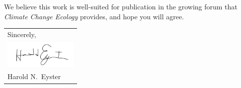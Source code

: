 \documentclass[11pt]{article}
\begin{document}
	We believe this work is well-suited for publication in the growing forum that \textit{Climate Change Ecology} provides, and hope you will agree. \\  %
	\null\hfill
	\begin{tabular}{l@{}}
		Sincerely, \\[1\normalbaselineskip] %
		\includegraphics[width=100pt]{sig}\\
		Harold N.\ Eyster
	\end{tabular}
	
\end{document}
